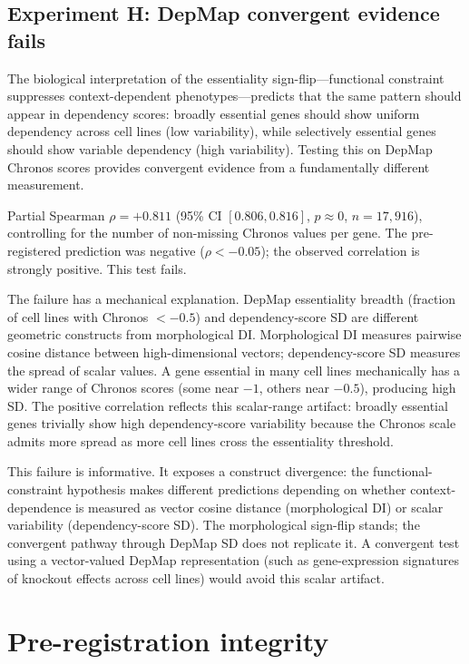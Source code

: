 \documentclass[11pt]{article}
\begin{document}
\subsection{Experiment H: DepMap convergent evidence fails}

The biological interpretation of the essentiality sign-flip---functional
constraint suppresses context-dependent phenotypes---predicts that the
same pattern should appear in dependency scores: broadly essential genes
should show uniform dependency across cell lines (low variability),
while selectively essential genes should show variable dependency (high
variability).  Testing this on DepMap Chronos scores provides convergent
evidence from a fundamentally different measurement.

Partial Spearman $\rho = +0.811$ (95\% CI $[0.806, 0.816]$,
$p \approx 0$, $n = 17{,}916$), controlling for the number of
non-missing Chronos values per gene.  The pre-registered prediction
was negative ($\rho < -0.05$); the observed correlation is strongly
positive.  This test fails.

The failure has a mechanical explanation.  DepMap essentiality breadth
(fraction of cell lines with Chronos $< -0.5$) and dependency-score SD
are different geometric constructs from morphological DI.  Morphological
DI measures pairwise cosine distance between high-dimensional vectors;
dependency-score SD measures the spread of scalar values.  A gene
essential in many cell lines mechanically has a wider range of Chronos
scores (some near $-1$, others near $-0.5$), producing high SD.  The
positive correlation reflects this scalar-range artifact: broadly
essential genes trivially show high dependency-score variability because
the Chronos scale admits more spread as more cell lines cross the
essentiality threshold.

This failure is informative.  It exposes a construct divergence: the
functional-constraint hypothesis makes different predictions depending
on whether context-dependence is measured as vector cosine distance
(morphological DI) or scalar variability (dependency-score SD).  The
morphological sign-flip stands; the convergent pathway through DepMap SD
does not replicate it.  A convergent test using a vector-valued DepMap
representation (such as gene-expression signatures of knockout effects
across cell lines) would avoid this scalar artifact.


\section{Pre-registration integrity}
\label{sec:integrity}
\end{document}
